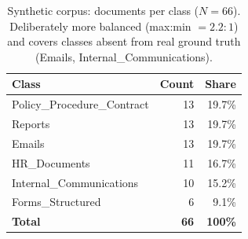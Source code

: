 \begin{table}[t]
  \centering
  \caption{Synthetic corpus: documents per class ($N=66$).
  Deliberately more balanced (max:min $= 2.2{:}1$) and covers classes
  absent from real ground truth (Emails, Internal\_Communications).}
  \label{tab:synthetic-class-dist}
  \begin{tabular}{lrr}
    \toprule
    Class & Count & Share \\
    \midrule
    Policy\_Procedure\_Contract & 13 & 19.7\% \\
    Reports                    & 13 & 19.7\% \\
    Emails                     & 13 & 19.7\% \\
    HR\_Documents              & 11 & 16.7\% \\
    Internal\_Communications   & 10 & 15.2\% \\
    Forms\_Structured          &  6 &  9.1\% \\
    \midrule
    \textbf{Total}             & \textbf{66} & \textbf{100\%} \\
    \bottomrule
  \end{tabular}
\end{table}
